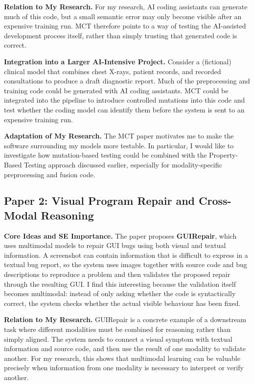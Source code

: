 \documentclass[11pt,a4paper]{article}
\begin{document}
\textbf{Relation to My Research.} For my research, AI coding assistants can generate much of this code, but a small semantic error may only become visible after an expensive training run. MCT therefore points to a way of testing the AI-assisted development process itself, rather than simply trusting that generated code is correct.

\textbf{Integration into a Larger AI-Intensive Project.} Consider a (fictional) clinical model that combines chest X-rays, patient records, and recorded consultations to produce a draft diagnostic report. Much of the preprocessing and training code could be generated with AI coding assistants. MCT could be integrated into the pipeline to introduce controlled mutations into this code and test whether the coding model can identify them before the system is sent to an expensive training run.

\textbf{Adaptation of My Research.} The MCT paper motivates me to make the software surrounding my models more testable. In particular, I would like to investigate how mutation-based testing could be combined with the Property-Based Testing approach discussed earlier, especially for modality-specific preprocessing and fusion code. 


\subsection{Paper 2: Visual Program Repair and Cross-Modal Reasoning \cite{huang2025seeing}}

\textbf{Core Ideas and SE Importance.} The paper proposes \textbf{GUIRepair}, which uses multimodal models to repair GUI bugs using both visual and textual information. A screenshot can contain information that is difficult to express in a textual bug report, so the system uses images together with source code and bug descriptions to reproduce a problem and then validates the proposed repair through the resulting GUI. I find this interesting because the validation itself becomes multimodal: instead of only asking whether the code is syntactically correct, the system checks whether the actual visible behaviour has been fixed.

\textbf{Relation to My Research.} GUIRepair is a concrete example of a downstream task where different modalities must be combined for reasoning rather than simply aligned. The system needs to connect a visual symptom with textual information and source code, and then use the result of one modality to validate another. For my research, this shows that multimodal learning can be valuable precisely when information from one modality is necessary to interpret or verify another.
\end{document}
